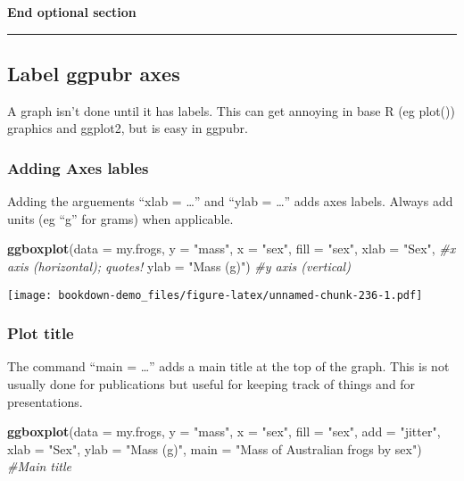 \documentclass[]{book}
\newenvironment{Shaded}{\begin{snugshade}}{\end{snugshade}}
\newcommand{\KeywordTok}[1]{\textcolor[rgb]{0.13,0.29,0.53}{\textbf{#1}}}
\newcommand{\DataTypeTok}[1]{\textcolor[rgb]{0.13,0.29,0.53}{#1}}
\newcommand{\StringTok}[1]{\textcolor[rgb]{0.31,0.60,0.02}{#1}}
\newcommand{\CommentTok}[1]{\textcolor[rgb]{0.56,0.35,0.01}{\textit{#1}}}
\newcommand{\NormalTok}[1]{#1}
\theoremstyle{definition}
\theoremstyle{definition}
\theoremstyle{definition}
\theoremstyle{remark}
\begin{document}
\textbf{End optional section}

\begin{center}\rule{0.5\linewidth}{\linethickness}\end{center}

\subsection{Label ggpubr axes}\label{label-ggpubr-axes}

A graph isn't done until it has labels. This can get annoying in base R
(eg plot()) graphics and ggplot2, but is easy in ggpubr.

\subsubsection{Adding Axes lables}\label{adding-axes-lables}

Adding the arguements ``xlab = \ldots{}'' and ``ylab = \ldots{}'' adds
axes labels. Always add units (eg ``g'' for grams) when applicable.

\begin{Shaded}
\begin{Highlighting}[]
\KeywordTok{ggboxplot}\NormalTok{(}\DataTypeTok{data =}\NormalTok{ my.frogs,}
          \DataTypeTok{y =} \StringTok{"mass"}\NormalTok{,}
          \DataTypeTok{x =} \StringTok{"sex"}\NormalTok{,}
          \DataTypeTok{fill =} \StringTok{"sex"}\NormalTok{,}
          \DataTypeTok{xlab =} \StringTok{"Sex"}\NormalTok{,      }\CommentTok{#x axis (horizontal); quotes!}
          \DataTypeTok{ylab =} \StringTok{"Mass (g)"}\NormalTok{) }\CommentTok{#y axis (vertical)}
\end{Highlighting}
\end{Shaded}

\texttt{[image: bookdown-demo\_files/figure-latex/unnamed-chunk-236-1.pdf]}

\subsubsection{Plot title}\label{plot-title}

The command ``main = \ldots{}'' adds a main title at the top of the
graph. This is not usually done for publications but useful for keeping
track of things and for presentations.

\begin{Shaded}
\begin{Highlighting}[]
\KeywordTok{ggboxplot}\NormalTok{(}\DataTypeTok{data =}\NormalTok{ my.frogs,}
          \DataTypeTok{y =} \StringTok{"mass"}\NormalTok{,}
          \DataTypeTok{x =} \StringTok{"sex"}\NormalTok{,}
          \DataTypeTok{fill =} \StringTok{"sex"}\NormalTok{,}
          \DataTypeTok{add =} \StringTok{"jitter"}\NormalTok{,}
          \DataTypeTok{xlab =} \StringTok{"Sex"}\NormalTok{,}
          \DataTypeTok{ylab =} \StringTok{"Mass (g)"}\NormalTok{,}
          \DataTypeTok{main =} \StringTok{"Mass of Australian frogs by sex"}\NormalTok{) }\CommentTok{#Main title}
\end{Highlighting}
\end{Shaded}
\end{document}
